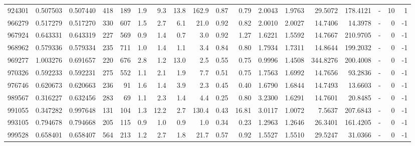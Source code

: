 \begin{tabular}{rrrrrrrrrrrrrrrlrr}
    924301 & 0.507503 &   0.507440 &  418 &  189 &      1.9 &      9.3 &    13.8 &    162.9 &       0.87 &        0.79 &  2.0043 &  1.9763 &   29.5072 &  178.4121 &             - &       10 &          1 \\
    966279 & 0.517279 &   0.517270 &  330 &  607 &      1.5 &      2.7 &     6.1 &     21.0 &       0.92 &        0.82 &  2.0010 &  2.0027 &   14.7406 &   14.3978 &             - &        0 &         -1 \\
    967924 & 0.643331 &   0.643319 &  227 &  569 &      0.9 &      1.4 &     0.7 &      3.0 &       0.92 &        1.27 &  1.6221 &  1.5592 &   14.7667 &  210.9705 &             - &        0 &         -1 \\
    968962 & 0.579336 &   0.579334 &  235 &  711 &      1.0 &      1.4 &     1.1 &      3.4 &       0.84 &        0.80 &  1.7934 &  1.7311 &   14.8644 &  199.2032 &             - &        0 &         -1 \\
    969277 & 1.003276 &   0.691657 &  220 &  676 &      2.8 &      1.2 &    13.0 &      2.5 &       0.55 &        0.75 &  0.9996 &  1.4508 &  344.8276 &  200.4008 &             - &        0 &         -1 \\
    970326 & 0.592233 &   0.592231 &  275 &  552 &      1.1 &      2.1 &     1.9 &      7.7 &       0.51 &        0.75 &  1.7563 &  1.6992 &   14.7656 &   93.2836 &             - &        0 &         -1 \\
    976746 & 0.620673 &   0.620663 &  236 &   91 &      1.6 &      1.4 &     3.9 &      2.3 &       0.45 &        0.40 &  1.6790 &  1.6844 &   14.7493 &   13.6603 &             - &        0 &         -1 \\
    989567 & 0.316227 &   0.632456 &  283 &   69 &      1.1 &      2.3 &     1.4 &      4.4 &       0.25 &        0.80 &  3.2300 &  1.6291 &   14.7601 &   20.8485 &             - &        0 &         -1 \\
    991055 & 0.347282 &   0.997648 &  131 &  104 &      1.3 &     12.2 &     2.7 &    130.4 &       0.43 &       16.81 &  3.0117 &  1.0072 &    7.5637 &  207.6843 &             - &        0 &         -1 \\
    993105 & 0.794678 &   0.794668 &  205 &  115 &      0.9 &      1.0 &     0.9 &      1.0 &       0.34 &        0.23 &  1.2963 &  1.2646 &   26.3401 &  161.4205 &             - &        0 &         -1 \\
    999528 & 0.658401 &   0.658407 &  564 &  213 &      1.2 &      2.7 &     1.8 &     21.7 &       0.57 &        0.92 &  1.5527 &  1.5510 &   29.5247 &   31.0366 &             - &        0 &         -1 \\

\end{tabular}
